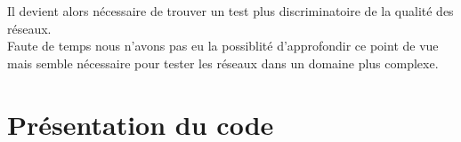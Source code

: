 \documentclass[a4paper,oneside]{report}
\begin{document}
                Il devient alors nécessaire de trouver un test plus discriminatoire de la qualité des 
réseaux.\\

                Faute de temps nous n'avons pas eu la possiblité d'approfondir ce point de vue mais 
semble nécessaire pour tester les réseaux dans un domaine plus complexe.

        \chapter{Présentation du code}
\end{document}
